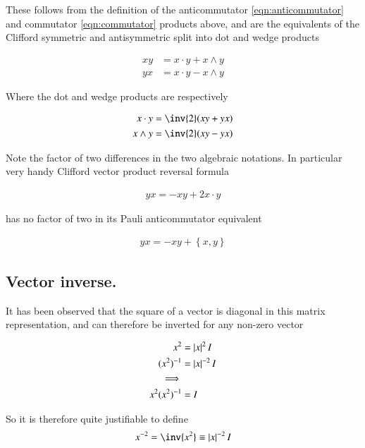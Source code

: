 \documentclass{article}
\newcommand{\symmetric}[2]{{\left\{{#1},{#2}\right\}}}
\begin{document}
These follows from the definition of the anticommutator 
\ref{eqn:anticommutator}
and commutator 
\ref{eqn:commutator}
products above, and are the equivalents of the Clifford symmetric and antisymmetric split into dot and wedge products

\begin{align}
x y &= {x} \cdot {y} + {x} \wedge {y} \\
y x &= {x} \cdot {y} - {x} \wedge {y}
\end{align}

Where the dot and wedge products are respectively

\begin{align*}
x \cdot y &= \inv{2}(x y + y x) \\
x \wedge y &= \inv{2}(x y - y x)
\end{align*}

Note the factor of two differences in the two algebraic notations.  In particular very handy Clifford vector product reversal formula

\begin{align*}
y x = - x y + 2 x \cdot y
\end{align*}

has no factor of two in its Pauli anticommutator equivalent

\begin{align}
y x = - x y + \symmetric{x}{y}
\end{align}

\subsection{ Vector inverse. }

It has been observed that the square of a vector is diagonal in this matrix representation, and can therefore be inverted for any non-zero vector

\begin{align*}
x^2 &= \left\lvert{x}\right\rvert^2 I \\
(x^2)^{-1} &= \left\lvert{x}\right\rvert^{-2} I \\
\implies \\
x^2 (x^2)^{-1} &= I \\
\end{align*}

So it is therefore quite justifiable to define
\begin{align*}
x^{-2} = \inv{x^2} \equiv \Abs{x}^{-2} I \\
\end{align*}
\end{document}
